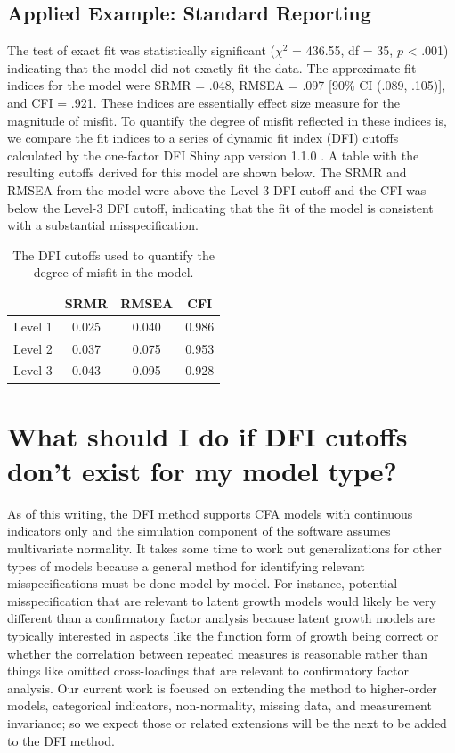\documentclass[
]{book}
\begin{document}
\hypertarget{applied-example-standard-reporting}{%
\section{Applied Example: Standard Reporting}\label{applied-example-standard-reporting}}

The test of exact fit was statistically significant (\({\chi}^2\) = 436.55, df = 35, \(p\) \textless{} .001) indicating that the model did not exactly fit the data. The approximate fit indices for the model were SRMR = .048, RMSEA = .097 {[}90\% CI (.089, .105){]}, and CFI = .921. These indices are essentially effect size measure for the magnitude of misfit. To quantify the degree of misfit reflected in these indices is, we compare the fit indices to a series of dynamic fit index (DFI) cutoffs \citep{mcneish_dynamic_2022} calculated by the one-factor DFI Shiny app version 1.1.0 \citep{wolf_dynamic_2020}. A table with the resulting cutoffs derived for this model are shown below. The SRMR and RMSEA from the model were above the Level-3 DFI cutoff and the CFI was below the Level-3 DFI cutoff, indicating that the fit of the model is consistent with a substantial misspecification.

\begin{table}

\caption{\label{tab:tab}The DFI cutoffs used to quantify the degree of misfit in the model.}
\centering
\begin{tabular}[t]{lccc}
\toprule
  & SRMR & RMSEA & CFI\\
\midrule
Level 1 & 0.025 & 0.040 & 0.986\\
Level 2 & 0.037 & 0.075 & 0.953\\
Level 3 & 0.043 & 0.095 & 0.928\\
\bottomrule
\end{tabular}
\end{table}

\hypertarget{nonexist}{%
\chapter{What should I do if DFI cutoffs don't exist for my model type?}\label{nonexist}}

As of this writing, the DFI method supports CFA models with continuous indicators only and the simulation component of the software assumes multivariate normality. It takes some time to work out generalizations for other types of models because a general method for identifying relevant misspecifications must be done model by model. For instance, potential misspecification that are relevant to latent growth models would likely be very different than a confirmatory factor analysis because latent growth models are typically interested in aspects like the function form of growth being correct or whether the correlation between repeated measures is reasonable rather than things like omitted cross-loadings that are relevant to confirmatory factor analysis. Our current work is focused on extending the method to higher-order models, categorical indicators, non-normality, missing data, and measurement invariance; so we expect those or related extensions will be the next to be added to the DFI method.
\end{document}
